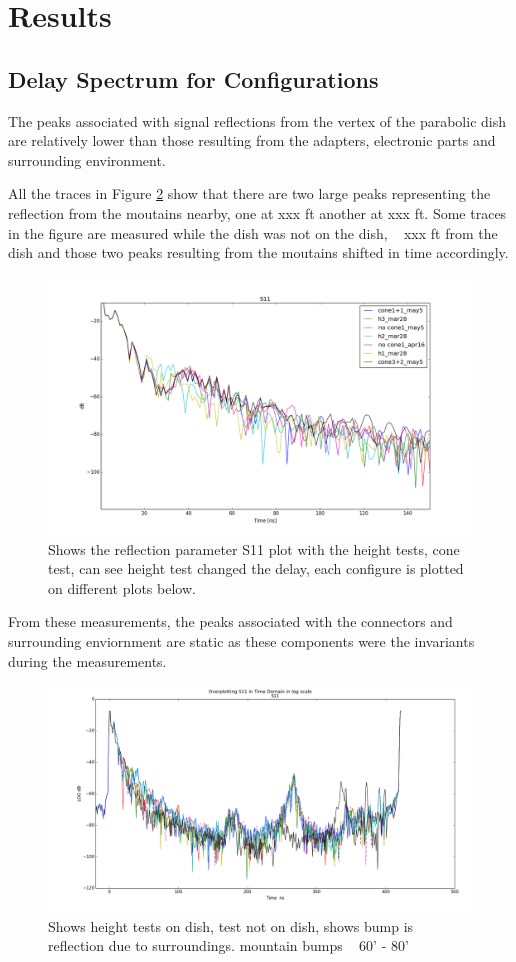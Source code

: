 \documentclass[preprint]{aastex}  %
\begin{document}
\section{Results}
\label{sec:results}
\subsection{Delay Spectrum for Configurations}


The peaks associated with signal reflections from the vertex of the parabolic dish are relatively lower than those resulting from the adapters, electronic parts and surrounding environment. 

All the traces in Figure \ref{Fig:moutain} show that there are two large peaks representing the reflection from the moutains nearby, one at xxx ft another at xxx ft. Some traces in the figure are measured while the dish was not on the dish, ~ xxx ft from the dish and those two peaks resulting from the moutains shifted in time accordingly.


\begin{figure}[H]
	\begin{center}
	\includegraphics[width =.7\textwidth]{./reflectometry_plots/configcompare10-150ns}
	\caption{Shows the reflection parameter S11 plot with the height tests, cone test, can see height test changed the delay, each configure is plotted on different plots below.
\label{Fig:} }
	\end{center}
\end{figure}

From these measurements, the peaks associated with the connectors and surrounding enviornment are static as these components were the invariants during the measurements. 
\begin{figure}[H]
	\begin{center}
	\includegraphics[width =.7\textwidth]{./reflectometry_plots/Mar28/s11all-mar28mix17set1}
	\caption{Shows height tests on dish, test not on dish, shows bump is reflection due to surroundings. mountain bumps ~ 60' - 80'
\label{Fig:moutain} }
	\end{center}
\end{figure}
\end{document}
